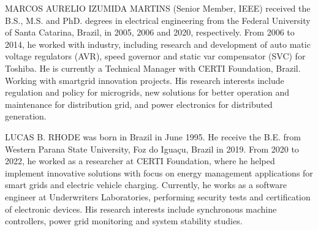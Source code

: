 \documentclass{ieeeaccess}
\begin{document}
    \begin{IEEEbiography}{MARCOS AURELIO IZUMIDA MARTINS}
        (Senior Member, IEEE) received the B.S., M.S. and PhD. degrees in electrical engineering from the Federal University of Santa Catarina, Brazil, in 2005, 2006 and 2020, respectively. From 2006 to 2014, he worked with industry, including research and development of auto matic voltage regulators (AVR), speed governor and static var compensator (SVC) for Toshiba. He is currently a Technical Manager with CERTI Foundation, Brazil. Working with smartgrid innovation projects. His research interests include regulation and policy for microgrids, new solutions for better operation and maintenance for distribution grid, and power electronics for distributed generation.
    \end{IEEEbiography}

	\begin{IEEEbiography}{LUCAS B. RHODE}
		 was born in Brazil in June 1995. He receive the B.E. from Western Parana State University, Foz do Iguaçu, Brazil in 2019. From 2020 to 2022, he worked as a researcher at CERTI Foundation, where he helped implement innovative solutions with focus on energy management applications for smart grids and electric vehicle charging. Currently, he works as a software engineer at Underwriters Laboratories, performing security tests and certification of electronic devices. His research interests include synchronous machine controllers, power grid monitoring and system stability studies.
	\end{IEEEbiography}
\end{document}
